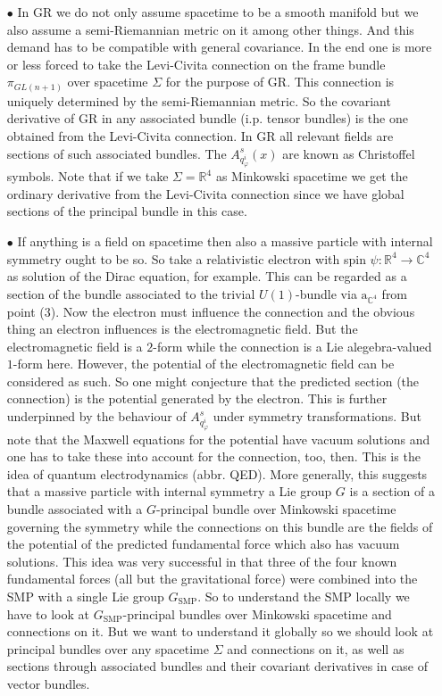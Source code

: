 \begin{enumerate}
\begin{enumerate}
\item[$\bullet$]
In GR we do not only assume spacetime to be a smooth manifold but we also assume a semi-Riemannian metric on it among other things. And this demand has to be compatible with general covariance. In the end one is more or less forced to take the Levi-Civita connection on the frame bundle $\pi_{GL(n+1)}$ over spacetime $\Sigma$ for the purpose of GR. This connection is uniquely determined by the semi-Riemannian metric. So the covariant derivative of GR in any associated bundle (i.p. tensor bundles) is the one obtained from the Levi-Civita connection. In GR all relevant fields are sections of such associated bundles. The $A_{q_{\varphi}^{i}}^{s}(x)$ are known as Christoffel symbols. Note that if we take $\Sigma = \mathbb{R}^{4}$ as Minkowski spacetime we get the ordinary derivative from the Levi-Civita connection since we have global sections of the principal bundle in this case.
\item[$\bullet$]
If anything is a field on spacetime then also a massive particle with internal symmetry ought to be so. So take a relativistic electron with spin $\psi \colon \mathbb{R}^{4} \rightarrow \mathbb{C}^{4}$ as solution of the Dirac equation, for example. This can be regarded as a section of the bundle associated to the trivial $U(1)$-bundle via $\mathrm{a}_{\mathbb{C}^{4}}$ from point (3). Now the electron must influence the connection and the obvious thing an electron influences is the electromagnetic field. But the electromagnetic field is a $2$-form while the connection is a Lie alegebra-valued $1$-form here. However, the potential of the electromagnetic field can be considered as such. So one might conjecture that the predicted section (the connection) is the potential generated by the electron. This is further underpinned by the behaviour of $A_{q_{\varphi}^{i}}^{s}$ under symmetry transformations. But note that the Maxwell equations for the potential have vacuum solutions and one has to take these into account for the connection, too, then. This is the idea of quantum electrodynamics (abbr. QED). More generally, this suggests that a massive particle with internal symmetry a Lie group $G$ is a section of a bundle associated with a $G$-principal bundle over Minkowski spacetime governing the symmetry while the connections on this bundle are the fields of the potential of the predicted fundamental force which also has vacuum solutions. This idea was very successful in that three of the four known fundamental forces (all but the gravitational force) were combined into the SMP with a single Lie group $G_{\textrm{SMP}}$. So to understand the SMP locally we have to look at $G_{\textrm{SMP}}$-principal bundles over Minkowski spacetime and connections on it. But we want to understand it globally so we should look at principal bundles over any spacetime $\Sigma$ and connections on it, as well as sections through associated bundles and their covariant derivatives in case of vector bundles.

\end{enumerate}
\end{enumerate}
